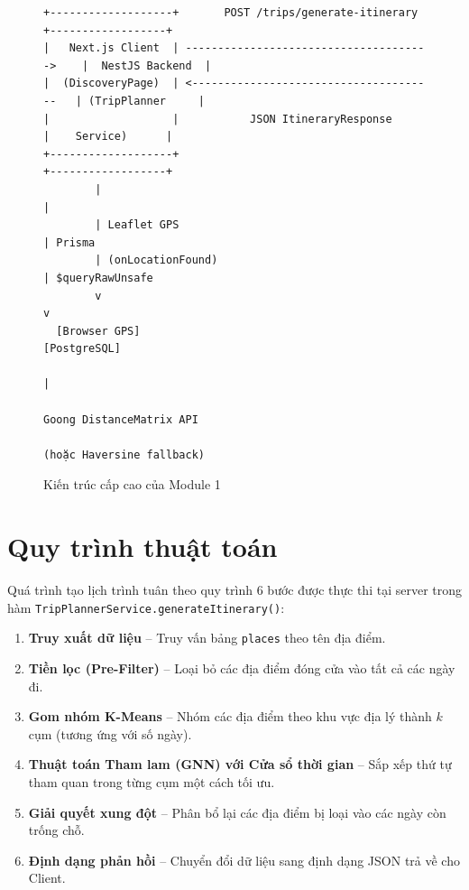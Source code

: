 \documentclass[12pt,a4paper]{report}
\begin{document}
\begin{figure}[H]
\centering
\begin{verbatim}
+-------------------+       POST /trips/generate-itinerary       +------------------+
|   Next.js Client  | -------------------------------------->    |  NestJS Backend  |
|  (DiscoveryPage)  | <--------------------------------------   | (TripPlanner     |
|                   |           JSON ItineraryResponse           |    Service)      |
+-------------------+                                            +------------------+
        |                                                               |
        | Leaflet GPS                                                   | Prisma
        | (onLocationFound)                                             | $queryRawUnsafe
        v                                                               v
  [Browser GPS]                                                   [PostgreSQL]
                                                                        |
                                                              Goong DistanceMatrix API
                                                              (hoặc Haversine fallback)
\end{verbatim}
\caption{Kiến trúc cấp cao của Module 1}
\end{figure}

\section{Quy trình thuật toán}
\label{sec:algorithm-pipeline}

Quá trình tạo lịch trình tuân theo quy trình 6 bước được thực thi tại server trong hàm \texttt{TripPlannerService.generateItinerary()}:

\begin{enumerate}
    \item \textbf{Truy xuất dữ liệu} -- Truy vấn bảng \texttt{places} theo tên địa điểm.
    \item \textbf{Tiền lọc (Pre-Filter)} -- Loại bỏ các địa điểm đóng cửa vào tất cả các ngày đi.
    \item \textbf{Gom nhóm K-Means} -- Nhóm các địa điểm theo khu vực địa lý thành $k$ cụm (tương ứng với số ngày).
    \item \textbf{Thuật toán Tham lam (GNN) với Cửa sổ thời gian} -- Sắp xếp thứ tự tham quan trong từng cụm một cách tối ưu.
    \item \textbf{Giải quyết xung đột} -- Phân bổ lại các địa điểm bị loại vào các ngày còn trống chỗ.
    \item \textbf{Định dạng phản hồi} -- Chuyển đổi dữ liệu sang định dạng JSON trả về cho Client.
\end{enumerate}
\end{document}

